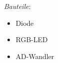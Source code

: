 \documentclass[11pt, a4paper]{article}
\begin{document}
\vfill
\emph{Bauteile}:
\begin{itemize}
\item Diode
\item RGB-LED
\item AD-Wandler
\end{itemize}

\end{document}
